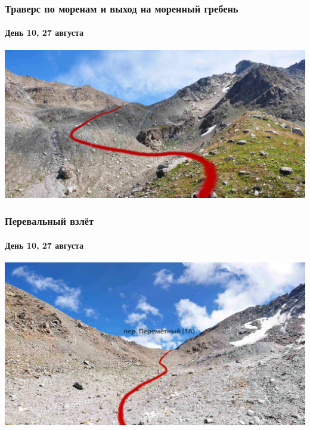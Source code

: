 \begin{frame}
	\frametitle{Траверс по моренам и выход на моренный гребень}
	\framesubtitle{День 10, 27 августа}
	\centering
	\includegraphics[width=\textwidth]{../pics/DSC_0280}			
\end{frame}

\begin{frame}
	\frametitle{Перевальный взлёт}
	\framesubtitle{День 10, 27 августа}
	\centering
	\includegraphics[width=\textwidth]{../pics/DSC_0341}			
\end{frame}

